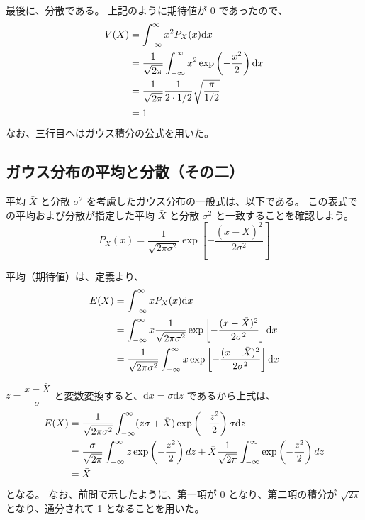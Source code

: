 \documentclass[uplatex,dvipdfmx,a4paper,11pt, titlepage]{jsarticle}
\newcommand{\diff}{\mathrm d}
\begin{document}
\begin{appendix}
最後に、分散である。
上記のように期待値が 0 であったので、
\begin{align}
V(X) &= \int_{-\infty}^{\infty} x^2 P_X(x) \diff x \notag \\
	&= \frac{1}{\sqrt{2 \pi}} \int_{-\infty}^{\infty} x^2 \exp \left(- \frac{x^2}{2} \right) \diff x \notag \\
	&= \frac{1}{\sqrt{2 \pi}} \frac{1}{2\cdot 1/2} \sqrt{\frac{\pi}{1/2}} \notag \\
	&=1
\end{align}
なお、三行目へはガウス積分の公式を用いた。

\subsection{ガウス分布の平均と分散（その二）}

平均 $ \bar{X}$ と分散 $\sigma^2$ を考慮したガウス分布の一般式は、以下である。
この表式での平均および分散が指定した平均 $ \bar{X}$ と分散 $\sigma^2$ と一致することを確認しよう。
\begin{equation}
P_X(x) = \frac{1}{\sqrt{2 \pi \sigma^2}} \exp \left[- \frac{(x -\bar{X})^2}{2 \sigma^2} \right]
\end{equation}


平均（期待値）は、定義より、
\begin{align}
E(X) &= \int_{-\infty}^{\infty} x P_X(x) \diff x \notag \\
	&= \int_{-\infty}^{\infty} x \frac{1}{\sqrt{2 \pi \sigma^2}} \exp \left[- \frac{(x -\bar{X})^2}{2 \sigma^2} \right] \diff x \notag \\
	&= \frac{1}{\sqrt{2 \pi \sigma^2}}  \int_{-\infty}^{\infty} x \exp \left[- \frac{(x -\bar{X})^2}{2 \sigma^2} \right] \diff x
\end{align}

$z=\dfrac{x -\bar{X}}{\sigma}$ と変数変換すると、$\diff x=\sigma \diff z$ であるから上式は、
\begin{align}
E(X) 
	&= \frac{1}{\sqrt{2 \pi \sigma^2}}  \int_{-\infty}^{\infty} (z\sigma + \bar{X}) \exp \left(- \frac{z^2}{2} \right) \sigma \diff z \notag \\
	&= \frac{\sigma}{\sqrt{2 \pi}}  \int_{-\infty}^{\infty} z \exp \left(- \frac{z^2}{2} \right) dz + \bar{X} \frac{1}{\sqrt{2 \pi}} \int_{-\infty}^{\infty} \exp \left(- \frac{z^2}{2} \right) dz \notag \\
	&= \bar{X}
\end{align}
となる。
なお、前問で示したように、第一項が 0  となり、第二項の積分が $\sqrt{2 \pi}$ となり、通分されて 1 となることを用いた。


\end{appendix}
\end{document}
